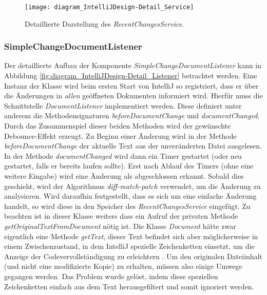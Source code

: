 \begin{figure}
    \centering
    \texttt{[image: diagram\_IntelliJDesign-Detail\_Service]}
    \caption{Detaillierte Darstellung des \emph{RecentChangesService}.}
    \label{fig:diagram_IntelliJDesign-Detail_Service}
\end{figure}

\subsubsection{SimpleChangeDocumentListener}

Der detaillierte Aufbau der Komponente \emph{SimpleChangeDocumentListener}
kann in Abbildung \ref{fig:diagram_IntelliJDesign-Detail_Listener} betrachtet werden.
Eine Instanz der Klasse wird beim ersten Start von IntelliJ so registriert, 
dass er über die Änderungen in \emph{allen} geöffneten Dokumenten informiert wird. 
Hierfür muss die Schnittstelle \emph{DocumentListener} implementiert werden.
Diese definiert unter anderem die Methodensignaturen \emph{beforeDocumentChange}
und \emph{documentChanged}. Durch das Zusammenspiel dieser beiden Methoden
wird der gewünschte Debounce-Effekt erzeugt. Zu Beginn einer Änderung
wird in der Methode \emph{beforeDocumentChange} der aktuelle Text aus der 
unveränderten Datei ausgelesen. In der Methode \emph{documentChanged} wird
dann ein Timer gestartet (oder neu gestartet, falls er bereits laufen sollte).
Erst nach Ablauf des Timers (ohne eine weitere Eingabe) wird
eine Änderung als abgeschlossen erkannt. Sobald dies geschieht, wird 
der Algorithmus \emph{diff-match-patch} verwendet, um die Änderung zu analysieren.
Wird daraufhin festgestellt, dass es sich um eine einfache Änderung handelt,
so wird diese in den Speicher des \emph{RecentChangesService} eingefügt.
Zu beachten ist in dieser Klasse weiters dass ein Aufruf der privaten Methode 
\emph{getOriginalTextFromDocument} nötig ist. 
Die Klasse \emph{Document} hätte zwar eigentlich
eine Methode \emph{getText}, dieser Text befindet sich aber möglicherweise
in einem Zwischenzustand, in dem IntelliJ spezielle Zeichenketten 
einsetzt, um die Anzeige der Codevervollständigung zu erleichtern
\cite{IntelliJTheDreadedString,IntelliJGitHubCompletionUtilCore}.
Um den originalen Dateiinhalt (und nicht eine modifizierte Kopie) zu erhalten,
müssen also einige Umwege gegangen werden. Das Problem wurde gelöst,
indem diese speziellen Zeichenketten einfach aus dem Text herausgefiltert
und somit ignoriert werden.

